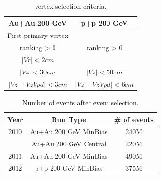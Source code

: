 \begin{table}
\begin{centering}
\begin{tabular}{c||c}
\hline 
Au+Au 200 GeV  & p+p 200 GeV\tabularnewline
\hline 
\hline 
First primary vertex & \tabularnewline
\hline 
ranking > 0 & ranking > 0\tabularnewline
\hline 
$|Vr|<2cm$ & \tabularnewline
\hline 
$|Vz|<30cm$ & $|Vz|<50cm$\tabularnewline
\hline 
$|Vz-VzVpd|<3cm$ & $|Vz-VzVpd|<6cm$\tabularnewline
\hline 
\end{tabular}
\par\end{centering}

\protect\caption{vertex selection criteria.}


\label{table: vertex selection criteria}
\end{table}


\begin{table}
\begin{centering}
\begin{tabular}{c|c|c}
\hline 
Year & Run Type & \# of events\tabularnewline
\hline 
\hline 
2010 & Au+Au 200 GeV MinBias & 240M\tabularnewline
\hline 
 & Au+Au 200 GeV Central & 220M\tabularnewline
\hline 
2011 & Au+Au 200 GeV MinBias & 490M\tabularnewline
\hline 
2012 & p+p 200 GeV MinBias & 375M\tabularnewline
\hline 
\end{tabular}
\par\end{centering}

\protect\caption{Number of events after event selection.}


\label{=000023 of Event}
\end{table}


